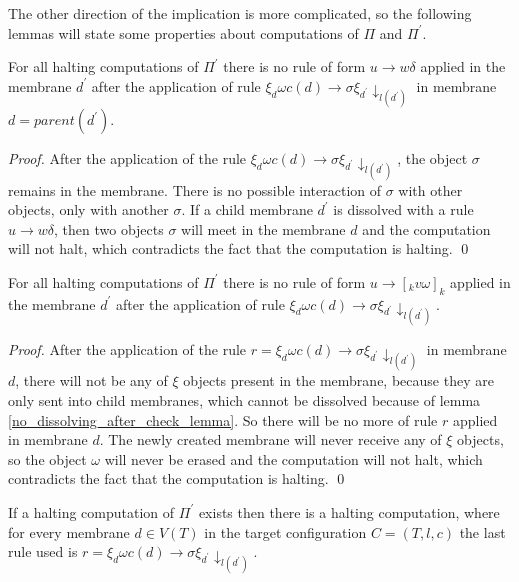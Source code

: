 \documentclass[llncs,submission,copyright,creativecommons]{../lib/lncs/llncs}
\begin{document}
The other direction of the implication is more complicated, so the following lemmas will state some properties about computations of $\Pi$ and $\Pi^\prime$.

\begin{lemma}
\label{no_dissolving_after_check_lemma}
  For all halting computations of $\Pi^\prime$ there is no rule of form $u\rightarrow w\delta$ applied in the membrane $d^\prime$ after the application of rule $\xi_d\omega c(d)\rightarrow\sigma\xi_{d^\prime}\downarrow_{l(d^\prime)}$ in membrane $d=parent(d^\prime)$.
\end{lemma}

\begin{proof}
  After the application of the rule $\xi_d\omega c(d)\rightarrow\sigma\xi_{d^\prime}\downarrow_{l(d^\prime)}$, the object $\sigma$ remains in the membrane. There is no possible interaction of $\sigma$ with other objects, only with another $\sigma$. If a child membrane $d^\prime$ is dissolved with a rule $u\rightarrow w\delta$, then two objects $\sigma$ will meet in the membrane $d$ and the computation will not halt, which contradicts the fact that the computation is halting. \qed
\end{proof}

\begin{lemma}
\label{no_creating_new_membrane_after_check_lemma}
  For all halting computations of $\Pi^\prime$ there is no rule of form $u\rightarrow [_k v\omega]_k$ applied in the membrane $d^\prime$ after the application of rule $\xi_d\omega c(d)\rightarrow\sigma\xi_{d^\prime}\downarrow_{l(d^\prime)}$.
\end{lemma}

\begin{proof}
  After the application of the rule $r = \xi_d\omega c(d)\rightarrow\sigma\xi_{d^\prime}\downarrow_{l(d^\prime)}$ in membrane $d$, there will not be any of $\xi$ objects present in the membrane, because they are only sent into child membranes, which cannot be dissolved because of lemma \ref{no_dissolving_after_check_lemma}. So there will be no more of rule $r$ applied in membrane $d$. The newly created membrane will never receive any of $\xi$ objects, so the object $\omega$ will never be erased and the computation will not halt, which contradicts the fact that the computation is halting. \qed
\end{proof}

\begin{lemma}
\label{check_at_last_lemma}
  If a halting computation of $\Pi^\prime$ exists then there is a halting computation, where for every membrane $d\in V(T)$ in the target configuration $C=(T,l,c)$ the last rule used is $r = \xi_d\omega c(d)\rightarrow\sigma\xi_{d^\prime}\downarrow_{l(d^\prime)}$.
\end{lemma}
\end{document}
